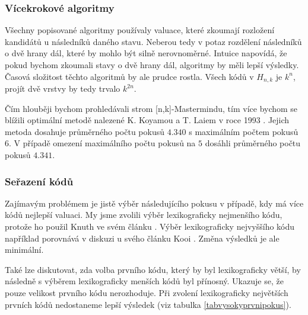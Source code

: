 
\subsubsection{Vícekrokové algoritmy}
Všechny popisované algoritmy používaly valuace, které zkoumají rozložení kandidátů u následníků daného stavu. 
Neberou tedy v potaz rozdělení následníků o dvě hrany dál, které by mohlo být silně nerovnoměrné. Intuice napovídá, že pokud bychom zkoumali stavy o dvě hrany dál, algoritmy by měli lepší výsledky. Časová složitost těchto algoritmů by ale prudce rostla. Všech kódů v $H_{n,k}$ je $k^n$, projít dvě vrstvy by tedy trvalo $k^{2n}$. 

Čím hlouběji bychom prohledávali strom [n,k]-Mastermindu, tím více bychom se blížili optimální metodě nalezené K. Koyamou a T. Laiem v roce 1993 \cite{koyama}. Jejich metoda dosahuje průměrného počtu pokusů $4.340$ s maximálním počtem pokusů $6$. V případě omezení maximálního počtu pokusů na $5$ dosáhli průměrného počtu pokusů $4.341$. 


\subsubsection{Seřazení kódů}
Zajímavým problémem je jistě výběr následujícího pokusu v případě, kdy má více kódů nejlepší valuaci. My jsme zvolili výběr lexikograficky nejmenšího kódu, protože ho použil Knuth ve svém článku \cite{donald_e__knuth_1977}. Výběr lexikograficky nejvyššího kódu například porovnává v diskuzi u svého článku Kooi \cite{kooi}. Změna výsledků je ale minimální. 

Také lze diskutovat, zda volba prvního kódu, který by byl lexikograficky větší, by následně s výběrem lexikograficky menších kódů byl přínosný. Ukazuje se, že pouze velikost prvního kódu nerozhoduje. Při zvolení lexikograficky největších prvních kódů nedostaneme lepší výsledek (viz tabulka \ref{tabvysokyprvnipokus}).


